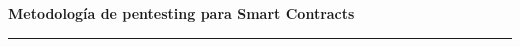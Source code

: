 \documentclass[11pt,a4paper,twoside]{report}
\begin{document}
\singlespacing
\RaggedRight

\begin{titlepage}
\begin{center}


\vspace{5cm}

\parbox{0.8\textwidth}{
    \centering
    \Large\textbf{Metodología de pentesting para Smart Contracts} \\
}

\vspace{8cm} %

\end{center}



\vspace{2mm} %

\noindent %
{\color{lightgray}\rule{\linewidth}{4pt}} %


\end{titlepage}

\pagestyle{fancy} %
\fancyhf{} %
\renewcommand{\headrulewidth}{0pt} %
\renewcommand{\footrulewidth}{0pt} %




\tableofcontents
\clearpage

 
% 
% 
% 
% 
% 

\appendix

\end{document}
